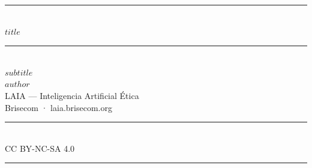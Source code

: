 
\thispagestyle{empty}
\begin{center}
\vspace*{2cm}
{\color{laprimary}\rule{\linewidth}{2pt}}\\[0.5cm]
{\Huge\bfseries\color{ladark} $title$}\\[0.3cm]
{\color{laprimary}\rule{\linewidth}{2pt}}\\[1.5cm]
{\Large\color{lagray} $subtitle$}\\[1cm]
{\large\color{lagray} $author$}\\[2cm]
{\large\textcolor{laprimary}{LAIA — Inteligencia Artificial Ética}}\\[0.3cm]
{\large\textcolor{laprimary}{Brisecom · laia.brisecom.org}}\\[0.3cm]
{\color{laaccent}\rule{0.4\linewidth}{1pt}}\\[0.5cm]
{\normalsize\textcolor{lagray} CC BY-NC-SA 4.0}\\[0.5cm]
\vfill
{\color{laprimary}\rule{\linewidth}{1pt}}
\end{center}
\newpage
